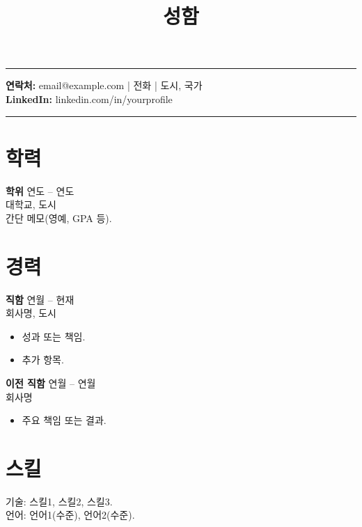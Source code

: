 \documentclass[11pt,a4paper]{article}
\title{\vspace{-1.2cm}\textbf{성함}}
\author{}
\date{}
\begin{document}
\maketitle
\vspace{-0.8cm}
\begin{flushright}\rule{2.2cm}{2.8cm}\end{flushright}

\textbf{연락처:} email@example.com \quad | \quad 전화 \quad | \quad 도시, 국가 \\
\textbf{LinkedIn:} linkedin.com/in/yourprofile

\vspace{0.4cm}
\noindent\rule{\textwidth}{0.4pt}

\section*{학력}
\textbf{학위} \hfill 연도 -- 연도 \\
대학교, 도시 \\
간단 메모(영예, GPA 등).

\section*{경력}
\textbf{직함} \hfill 연월 -- 현재 \\
회사명, 도시 \\
\begin{itemize}
  \item 성과 또는 책임.
  \item 추가 항목.
\end{itemize}

\textbf{이전 직함} \hfill 연월 -- 연월 \\
회사명 \\
\begin{itemize}
  \item 주요 책임 또는 결과.
\end{itemize}

\section*{스킬}
기술: 스킬1, 스킬2, 스킬3. \\
언어: 언어1(수준), 언어2(수준).
\end{document}
